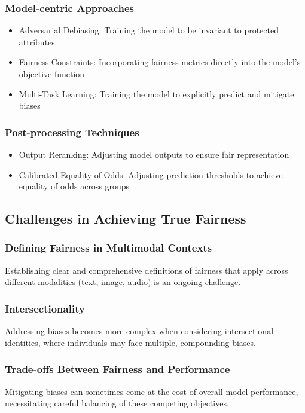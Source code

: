 \subsubsection{Model-centric Approaches}
\begin{itemize}
    \item Adversarial Debiasing: Training the model to be invariant to protected attributes
    \item Fairness Constraints: Incorporating fairness metrics directly into the model's objective function
    \item Multi-Task Learning: Training the model to explicitly predict and mitigate biases
\end{itemize}

\subsubsection{Post-processing Techniques}
\begin{itemize}
    \item Output Reranking: Adjusting model outputs to ensure fair representation
    \item Calibrated Equality of Odds: Adjusting prediction thresholds to achieve equality of odds across groups
\end{itemize}

\subsection{Challenges in Achieving True Fairness}
\subsubsection{Defining Fairness in Multimodal Contexts}
Establishing clear and comprehensive definitions of fairness that apply across different modalities (text, image, audio) is an ongoing challenge.

\subsubsection{Intersectionality}
Addressing biases becomes more complex when considering intersectional identities, where individuals may face multiple, compounding biases.

\subsubsection{Trade-offs Between Fairness and Performance}
Mitigating biases can sometimes come at the cost of overall model performance, necessitating careful balancing of these competing objectives.

